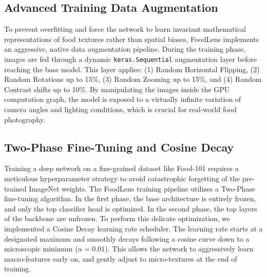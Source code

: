 \documentclass[conference]{IEEEtran}
\begin{document}
\subsection{Advanced Training Data Augmentation}
To prevent overfitting and force the network to learn invariant mathematical representations of food textures rather than spatial biases, FoodLens implements an aggressive, native data augmentation pipeline. During the training phase, images are fed through a dynamic \texttt{keras.Sequential} augmentation layer before reaching the base model. This layer applies: (1) Random Horizontal Flipping, (2) Random Rotations up to 15\%, (3) Random Zooming up to 15\%, and (4) Random Contrast shifts up to 10\%. By manipulating the images inside the GPU computation graph, the model is exposed to a virtually infinite variation of camera angles and lighting conditions, which is crucial for real-world food photography.

\subsection{Two-Phase Fine-Tuning and Cosine Decay}
Training a deep network on a fine-grained dataset like Food-101 requires a meticulous hyperparameter strategy to avoid catastrophic forgetting of the pre-trained ImageNet weights. The FoodLens training pipeline utilizes a Two-Phase fine-tuning algorithm. In the first phase, the base architecture is entirely frozen, and only the top classifier head is optimized. In the second phase, the top layers of the backbone are unfrozen. To perform this delicate optimization, we implemented a Cosine Decay learning rate scheduler. The learning rate starts at a designated maximum and smoothly decays following a cosine curve down to a microscopic minimum ($\alpha=0.01$). This allows the network to aggressively learn macro-features early on, and gently adjust to micro-textures at the end of training.
\end{document}
